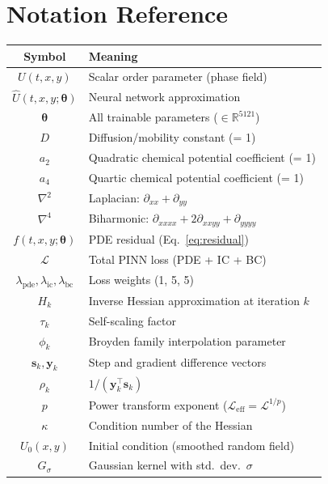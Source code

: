 \documentclass[11pt,a4paper]{article}
\begin{document}
\appendix
\section{Notation Reference}
\label{sec:notation}

\begin{center}
\renewcommand{\arraystretch}{1.3}
\begin{tabular}{@{}cl@{}}
\toprule
\textbf{Symbol} & \textbf{Meaning} \\
\midrule
$U(t,x,y)$                    & Scalar order parameter (phase field) \\
$\hat{U}(t,x,y;\bm\theta)$   & Neural network approximation \\
$\bm\theta$                    & All trainable parameters ($\in\mathbb{R}^{5121}$) \\
$D$                            & Diffusion/mobility constant (= 1) \\
$a_2$                          & Quadratic chemical potential coefficient (= 1) \\
$a_4$                          & Quartic chemical potential coefficient (= 1) \\
$\nabla^2$                     & Laplacian: $\partial_{xx} + \partial_{yy}$ \\
$\nabla^4$                     & Biharmonic: $\partial_{xxxx} + 2\partial_{xxyy} + \partial_{yyyy}$ \\
$f(t,x,y;\bm\theta)$          & PDE residual (Eq.~\eqref{eq:residual}) \\
$\mathcal{L}$                 & Total PINN loss (PDE + IC + BC) \\
$\lambda_{\mathrm{pde}},\lambda_{\mathrm{ic}},\lambda_{\mathrm{bc}}$
  & Loss weights (1, 5, 5) \\
$H_k$                          & Inverse Hessian approximation at iteration $k$ \\
$\tau_k$                       & Self-scaling factor \\
$\phi_k$                       & Broyden family interpolation parameter \\
$\bm{s}_k, \bm{y}_k$          & Step and gradient difference vectors \\
$\rho_k$                       & $1 / (\bm{y}_k^\top \bm{s}_k)$ \\
$p$                            & Power transform exponent ($\mathcal{L}_{\mathrm{eff}} = \mathcal{L}^{1/p}$) \\
$\kappa$                       & Condition number of the Hessian \\
$U_0(x,y)$                    & Initial condition (smoothed random field) \\
$G_{\sigma}$                  & Gaussian kernel with std.\ dev.\ $\sigma$ \\
\bottomrule
\end{tabular}
\end{center}
\end{document}
